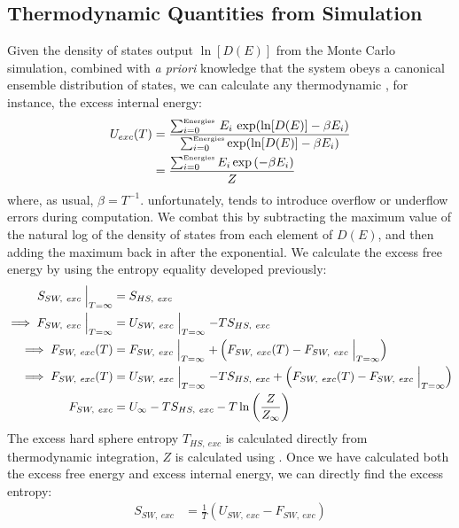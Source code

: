 \documentclass[12pt]{article}
\newcommand{\ignore}[1]{}
\begin{document}
\subsection{Thermodynamic Quantities from Simulation}
Given the density of states output $\ln[D(E)]$ from the Monte Carlo simulation, combined with {\it a priori} knowledge that the system obeys a canonical ensemble distribution of states, we can calculate any thermodynamic , for instance, the excess internal energy:
\begin{align}
     U_{exc}(T) &= \frac{\sum_{i=0}^{\text{\tiny Energies}}\,E_i\, \exp(\ln[D(E)] - \beta E_i)}{\sum_{i=0}^{\text{\tiny Energies}} \exp(\ln[D(E)] - \beta E_i)}\\
     &= \frac{\sum_{i=0}^{\text{\tiny Energies}} E_i \exp\left(-\beta E_i\right)}{Z}
\end{align} 
where, as usual, $\beta = T^{-1}$.  unfortunately, tends to introduce overflow or underflow errors during computation. We combat this by subtracting the maximum value of the natural log of the density of states \ignore{subtracting maximum ought to make it more negative\dots}from each element of $D(E)$, and then adding the maximum back in after the exponential. We calculate the excess free energy by using the entropy equality developed previously:
\begin{align}
     S_{SW,~exc}\Bigm\lvert_{T=\infty} &= S_{HS,~exc}\\
     \implies F_{SW,~exc}\Bigm\lvert_{T=\infty} &= U_{SW,~exc}\Bigm\lvert_{T=\infty} -TS_{HS,~exc} \\
     \implies F_{SW,~exc}(T) &= F_{SW,~exc}\Bigm\lvert_{T=\infty} + \left(F_{SW,~exc}(T) - F_{SW,~exc}\Bigm\lvert_{T=\infty}\right)
     \\
     \implies F_{SW,~exc}(T) &= U_{SW,~exc}\Bigm\lvert_{T=\infty} -TS_{HS,~exc} + \left(F_{SW,~exc}(T) - F_{SW,~exc}\Bigm\lvert_{T=\infty}\right)
     \\
     F_{SW,~exc} &= U_{\infty} -TS_{HS,~exc} - T\ln\left(\frac{Z}{Z_{\infty}}\right)
\end{align} 
The excess hard sphere entropy $T_{HS,~exc}$ is calculated directly from thermodynamic integration, $Z$ is calculated using  . Once we have calculated both the excess free energy and excess internal energy, we can directly find the excess entropy:
\begin{align}
    S_{SW, ~exc} &= \frac{1}{T}\left(U_{SW,~exc} - F_{SW,~exc} \right)
\end{align}
\end{document}
